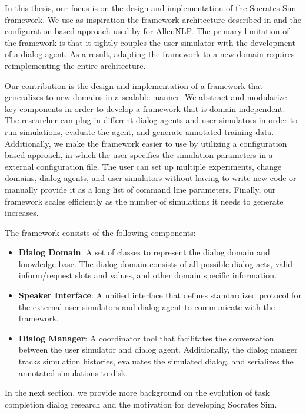 In this thesis, our focus is on the design and implementation of the Socrates Sim framework. We use as inspiration the framework architecture described in \cite{li_usersim} and the configuration based approach used by \cite{Gardner_allennlp} for AllenNLP. The primary limitation of the \cite{li_end_to_end} framework is that it tightly couples the user simulator with the development of a dialog agent. As a result, adapting the framework to a new domain requires reimplementing the entire architecture. 

Our contribution is the design and implementation of a framework that generalizes to new domains in a scalable manner. We abstract and modularize key components in order to develop a framework that is domain independent. The researcher can plug in different dialog agents and user simulators in order to run simulations, evaluate the agent, and generate annotated training data. Additionally, we make the framework easier to use by utilizing a configuration based approach, in which the user specifies the simulation parameters in a external configuration file. The user can set up multiple experiments, change domains, dialog agents, and user simulators without having to write new code or manually provide it as a long list of command line parameters. Finally, our framework scales efficiently as the number of simulations it needs to generate increases. 

The framework consists of the following components:
\begin{itemize}
	\item \textbf{Dialog Domain}: A set of classes to represent the dialog domain and knowledge base. The dialog domain consists of all possible dialog acts, valid inform/request slots and values, and other domain specific information. 
	\item \textbf{Speaker Interface}: A unified interface that defines standardized protocol for the external user simulators and dialog agent to communicate with the framework. 
	\item \textbf{Dialog Manager}: A coordinator tool that facilitates the conversation between the user simulator and dialog agent. Additionally, the dialog manger tracks simulation histories, evaluates the simulated dialog, and serializes the annotated simulations to disk.  
\end{itemize}

In the next section, we provide more background on the evolution of task completion dialog research and the motivation for developing Socrates Sim. 

